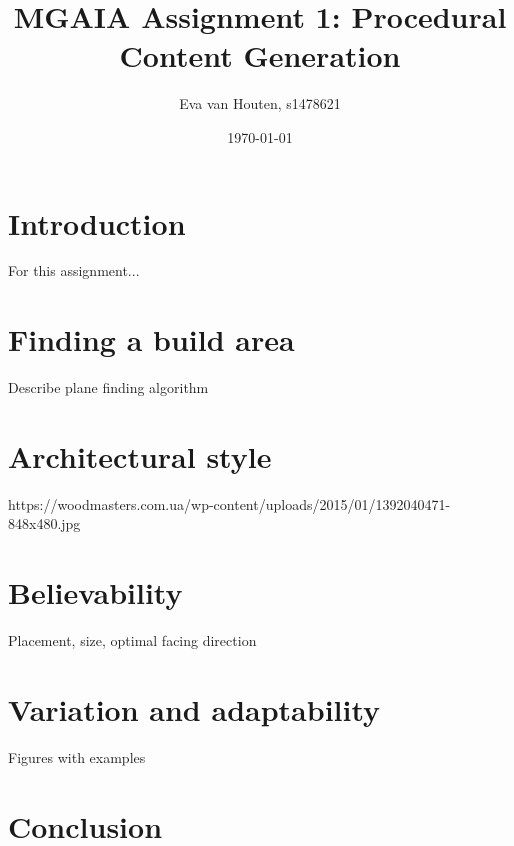 \documentclass[10pt]{article}
\title{MGAIA Assignment 1: Procedural Content Generation}
\date{\today}
\author{Eva van Houten, s1478621}
\begin{document}
\maketitle

\section{Introduction}
For this assignment...

\section{Finding a build area}
Describe plane finding algorithm


\section{Architectural style}
https://woodmasters.com.ua/wp-content/uploads/2015/01/1392040471-848x480.jpg

\section{Believability}
Placement, size, optimal facing direction

\section{Variation and adaptability}
Figures with examples


\section{Conclusion}
\end{document}
